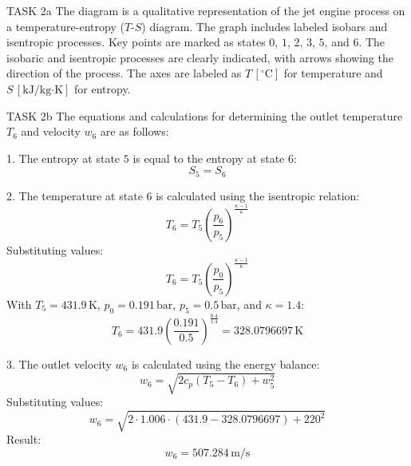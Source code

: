 TASK 2a  
The diagram is a qualitative representation of the jet engine process on a temperature-entropy (\(T\)-\(S\)) diagram. The graph includes labeled isobars and isentropic processes. Key points are marked as states \(0\), \(1\), \(2\), \(3\), \(5\), and \(6\). The isobaric and isentropic processes are clearly indicated, with arrows showing the direction of the process. The axes are labeled as \(T \, [^\circ\text{C}]\) for temperature and \(S \, [\text{kJ}/\text{kg·K}]\) for entropy.  

TASK 2b  
The equations and calculations for determining the outlet temperature \(T_6\) and velocity \(w_6\) are as follows:  

1. The entropy at state \(5\) is equal to the entropy at state \(6\):  
   \[
   S_5 = S_6
   \]

2. The temperature at state \(6\) is calculated using the isentropic relation:  
   \[
   T_6 = T_5 \left( \frac{p_6}{p_5} \right)^{\frac{\kappa - 1}{\kappa}}
   \]
   Substituting values:  
   \[
   T_6 = T_5 \left( \frac{p_0}{p_5} \right)^{\frac{\kappa - 1}{\kappa}}
   \]
   With \(T_5 = 431.9 \, \text{K}\), \(p_0 = 0.191 \, \text{bar}\), \(p_5 = 0.5 \, \text{bar}\), and \(\kappa = 1.4\):  
   \[
   T_6 = 431.9 \left( \frac{0.191}{0.5} \right)^{\frac{0.4}{1.4}} = 328.0796697 \, \text{K}
   \]

3. The outlet velocity \(w_6\) is calculated using the energy balance:  
   \[
   w_6 = \sqrt{2 c_p (T_5 - T_6) + w_5^2}
   \]
   Substituting values:  
   \[
   w_6 = \sqrt{2 \cdot 1.006 \cdot (431.9 - 328.0796697) + 220^2}
   \]
   Result:  
   \[
   w_6 = 507.284 \, \text{m/s}
   \]